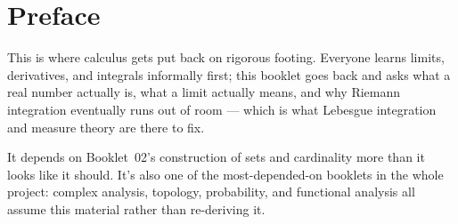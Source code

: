 \chapter*{Preface}

This is where calculus gets put back on rigorous footing.
Everyone learns limits, derivatives, and integrals informally first;
this booklet goes back and asks what a real number actually is, what a
limit actually means, and why Riemann integration eventually runs out
of room --- which is what Lebesgue integration and measure theory are
there to fix.

It depends on Booklet~02's construction of sets and cardinality more
than it looks like it should. It's also one of the most-depended-on
booklets in the whole project: complex analysis, topology, probability,
and functional analysis all assume this material rather than re-deriving
it.
